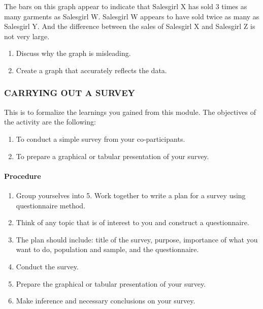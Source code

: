 \begin{myenumerate}
\item The bars on this graph appear to indicate that Salesgirl X has sold 3 times as many
garments as Salesgirl W. Salesgirl W appears to have sold twice as many as Salesgirl Y.
And the difference between the sales of Salesgirl X and Salesgirl Z is not very large.
\begin{enumerate}
\item Discuss why the graph is misleading.
\item Create a graph that accurately reflects the data.
\begin{center}
\end{center}
\end{enumerate}
\end{myenumerate}

\subsubsection*{CARRYING OUT A SURVEY}
This is to formalize the learnings you gained from this module. The objectives of
the activity are the following:
\begin{enumerate}
\item To conduct a simple survey from your co-participants.
\item To prepare a graphical or tabular presentation of your survey.
\end{enumerate}

\paragraph*{Procedure}
\begin{enumerate}
\item Group yourselves into 5. Work together to write a plan for a survey using questionnaire
method.
\item Think of any topic that is of interest to you and construct a questionnaire.
\item The plan should include: title of the survey, purpose, importance of what you want to
do, population and sample, and the questionnaire.
\item Conduct the survey.
\item Prepare the graphical or tabular presentation of your survey.
\item Make inference and necessary conclusions on your survey.
\end{enumerate}

